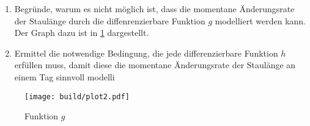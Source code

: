 \begin{itemize}
         \begin{enumerate}
             \item Begründe, warum es nicht möglich ist, dass die momentane Änderungsrate der Staulänge durch die diffenrenzierbare Funktion $g$ modelliert werden kann.
                 Der Graph dazu ist in \ref{fig:g} dargestellt.
            \item Ermittel die notwendige Bedingung, die jede differenzierbare Funktion $h$ erfüllen muss, damit diese die momentane Änderungsrate der Staulänge an einem Tag sinnvoll modelli
        \end{enumerate}
\end{itemize}
\begin{figure}
    \centering
    \texttt{[image: build/plot2.pdf]}
    \caption{Funktion $g$}
    \label{fig:g}
\end{figure}


